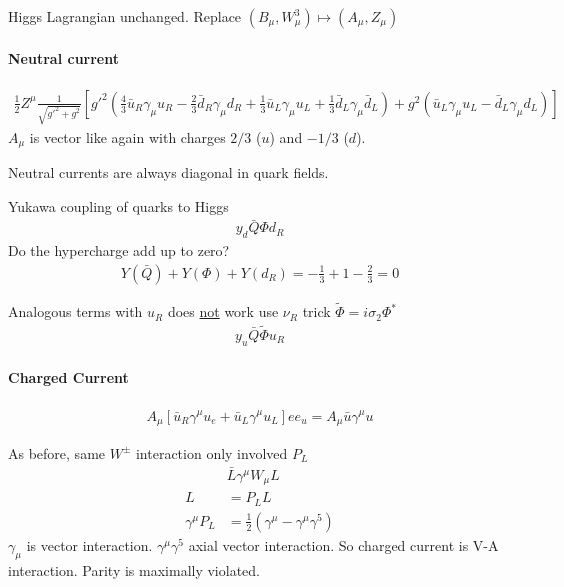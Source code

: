 Higgs Lagrangian unchanged. Replace $(B_\mu, W_\mu^3) \mapsto (A_\mu, Z_\mu)$

\paragraph{Neutral current}
\begin{align}
   \frac{1}{2} Z^\mu \frac{1}{\sqrt{g'^2 + g^2}} \left[ g'^2 \left( \frac{4}{3} \bar{u}_R \gamma_\mu u_R - \frac{2}{3}\bar{d}_R \gamma_\mu d_R + \frac{1}{3} \bar{u}_L \gamma_\mu u_L + \frac{1}{3} \bar{d}_L \gamma_\mu \bar{d}_L \right) + g^2 \left( \bar{u}_L \gamma_\mu u_L - \bar{d}_L \gamma_\mu d_L \right) \right]
\end{align}
$A_\mu$ is vector like again with charges $2/3$ ($u$) and $-1/3$ ($d$).

Neutral currents are always diagonal in quark fields. 

Yukawa coupling of quarks to Higgs
\begin{align*}
   y_d \bar{Q} \Phi d_R
\end{align*}
Do the hypercharge add up to zero?
\begin{align*}
   Y(\bar{Q}) + Y(\Phi) + Y(d_R) = -\frac{1}{3} + 1 - \frac{2}{3} = 0
\end{align*}

Analogous terms with $u_R$ does \underline{not} work use $\nu_R$ trick $\tilde{\Phi} = i\sigma_2 \Phi^*$
\begin{align*}
   y_u \bar{Q} \tilde{\Phi} u_R
\end{align*}

\paragraph{Charged Current}

\begin{align}
   A_\mu \left[ \bar{u}_R \gamma^\mu u_e + \bar{u}_L \gamma^\mu u_L \right] e e_u = A_\mu \bar{u} \gamma^\mu u
\end{align}

As before, same $W^\pm$ interaction only involved $P_L$
\begin{align*}
   & \bar{L} \gamma^\mu W_\mu L \\
   L &= P_L L \\
   \gamma^\mu P_L &= \frac{1}{2} \left( \gamma^\mu - \gamma^\mu \gamma^5 \right)
\end{align*}
$\gamma_\mu$ is vector interaction. $\gamma^\mu \gamma^5$ axial vector interaction. 
So charged current is V-A interaction. Parity is maximally violated.


